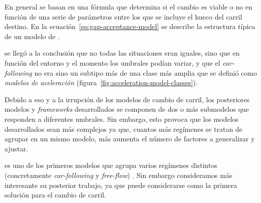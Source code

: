 En general se basan en una fórmula que determina si el cambio es viable o no en función de una serie de parámetros entre los que se incluye el hueco del carril destino. En la ecuación~\ref{eq:gap-acceptance-model} se describe la estructura típica de un modelo de \textit{}. 


 se llegó a la conclusión que no todas las situaciones eran iguales, sino que en función del entorno y el momento los umbrales podían variar, y que el \textit{\gls{car-following}} no era sino un subtipo más de una clase más amplia que se definió como \textit{modelos de aceleración} (figura~\ref{fig:acceleration-model-classes}).

Debido a eso y a la irrupción de los modelos de cambio de carril, los posteriores modelos y \textit{frameworks} desarrollados se componen de dos o más submodelos que responden a diferentes umbrales. Sin embargo, esto provoca que los modelos desarrollados sean más complejos ya que, cuantos más regímenes se tratan de agrupar en un mismo modelo, más aumenta el número de factores a generalizar y ajustar.

 es uno de los primeros modelos que agrupa varios regímenes distintos (concretamente \textit{\gls{car-following}} y \textit{\gls{free-flow}}) \cite{Gipps1981}. Sin embargo consideramos más interesante su posterior trabajo, \cite{Gipps1986} ya que puede considerarse como la primera solución para el cambio de carril.


